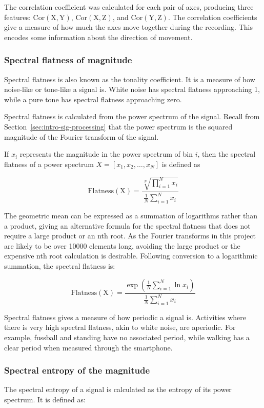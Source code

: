         The correlation coefficient was calculated for each pair of axes, producing three features: $\mathrm{Cor(X,Y)}$, $\mathrm{Cor(X,Z)}$, and $\mathrm{Cor(Y,Z)}$. The correlation coefficients give a measure of how much the axes move together during the recording. This encodes some information about the direction of movement.
      \subsubsection{Spectral flatness of magnitude}
        Spectral flatness is also known as the tonality coefficient. It is a measure of how noise-like or tone-like a signal is. White noise has spectral flatness approaching 1, while a pure tone has spectral flatness approaching zero.
        
        Spectral flatness is calculated from the power spectrum of the signal. Recall from Section~\ref{sec:intro-sig-processing} that the power spectrum is the squared magnitude of the Fourier transform of the signal.
        
        If $x_i$ represents the magnitude in the power spectrum of bin $i$, then the spectral flatness of a power spectrum $X = [x_1, x_2, \dots , x_N]$ is defined as
        
        $$\mathrm{Flatness(X)} = \frac{\sqrt[N]{\prod\limits_{i=1}^N x_i}}{\frac{1}{N}\sum_{i=1}^N x_i}$$
        
        The geometric mean can be expressed as a summation of logarithms rather than a product, giving an alternative formula for the spectral flatness that does not require a large product or an nth root. As the Fourier transforms in this project are likely to be over 10000 elements long, avoiding the large product or the expensive nth root calculation is desirable. Following conversion to a logarithmic summation, the spectral flatness is:
        
        $$\mathrm{Flatness(X)} = \frac{\exp \left( \frac{1}{N}\sum\limits_{i=1}^N \ln x_i \right) }{\frac{1}{N}\sum_{i=1}^N x_i}$$
        
        Spectral flatness gives a measure of how periodic a signal is. Activities where there is very high spectral flatness, akin to white noise, are aperiodic. For example, fussball and standing have no associated period, while walking has a clear period when measured through the smartphone.
      \subsubsection{Spectral entropy of the magnitude}
        The spectral entropy of a signal is calculated as the entropy of its power spectrum. It is defined as:


